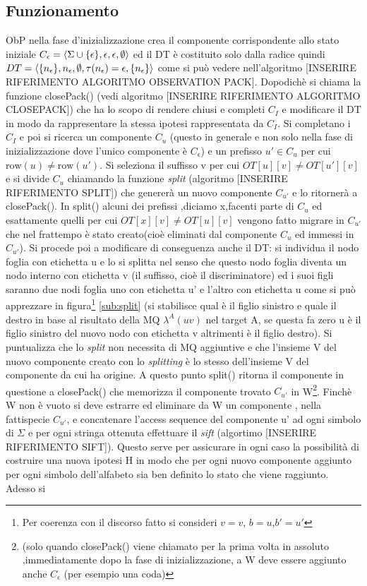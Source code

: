 \subsection{Funzionamento}
\ac{ObP} nella fase d'inizializzazione crea il componente corrispondente allo stato iniziale $C_{\epsilon} = \Braket{\Sigma \cup \{\epsilon\},\epsilon,\epsilon,\emptyset}$ ed il \ac{DT} è costituito solo dalla radice quindi $DT = \Braket{\{n_{\epsilon}\},n_{\epsilon},\emptyset,\tau(n_{\epsilon})=\epsilon,\{n_{\epsilon}\}}$ come si può vedere nell'algoritmo [INSERIRE RIFERIMENTO ALGORITMO OBSERVATION PACK]. Dopodichè si chiama la funzione closePack() (vedi algoritmo [INSERIRE RIFERIMENTO ALGORITMO CLOSEPACK]) che ha lo scopo di rendere chiusi e completi $C_{I}$ e modificare il \ac{DT} in modo da rappresentare la stessa ipotesi rappresentata da $C_{I}$. Si completano i $C_{I}$ e poi si ricerca un componente $C_{u}$ (questo in generale e non solo nella fase di inizializzazione dove l'unico componente è $C_{\epsilon}$) e un prefisso $u' \in C_{u}$ per cui $\text{row}(u) \neq \text{row}(u')$. Si seleziona il suffisso v per cui $OT[u][v] \neq OT[u'][v]$ e si divide $C_u$ chiamando la funzione \textit{split} (algoritmo [INSERIRE RIFERIMENTO SPLIT]) che genererà un nuovo componente $C_{u'}$ e lo ritornerà a closePack(). In split() alcuni dei prefissi ,diciamo x,facenti parte di $C_{u}$ ed esattamente quelli per cui $OT[x][v] \neq OT[u][v]$ vengono fatto migrare in $C_{u'}$ che nel frattempo è stato creato(cioè eliminati dal componente $C_{u}$ ed immessi in $C_{u'}$). Si procede poi a modificare di conseguenza anche il \ac{DT}: si individua il nodo foglia con etichetta u e lo si splitta nel senso che questo nodo foglia diventa un nodo interno con etichetta v (il suffisso, cioè il discriminatore) ed i suoi figli saranno due nodi foglia uno con etichetta u' e l'altro con etichetta u come si può apprezzare in figura\footnote{Per coerenza con il discorso fatto si consideri $v=v$, $b=u$,$b'=u'$} \ref{sub:split} (si stabilisce qual è il figlio sinistro e quale il destro in base al risultato della \ac{MQ} $\lambda^{A}(uv)$ nel target A, se questa fa zero u è il figlio sinistro del nuovo nodo con etichetta v altrimenti è il figlio destro). Si puntualizza che lo \textit{split} non necessita di \ac{MQ} aggiuntive e che l'insieme V del nuovo componente creato con lo \textit{splitting} è lo stesso dell'insieme V del componente da cui ha origine. A questo punto split() ritorna il componente in questione a closePack() che memorizza il componente trovato $C_{u'}$ in W\footnote{ (solo quando closePack() viene chiamato per la prima volta in assoluto ,immediatamente dopo la fase di inizializzazione, a W deve essere aggiunto anche $C_{\epsilon}$ (per esempio una coda)}. Finchè W non è vuoto si deve estrarre ed eliminare da W un componente , nella fattispecie $C_{u'}$, e concatenare l'access sequence del componente u' ad ogni simbolo di $\Sigma$ e per ogni stringa ottenuta effettuare il \textit{sift} (algortimo [INSERIRE RIFERIMENTO SIFT]). Questo serve per assicurare in ogni caso la possibilità di costruire una nuova ipotesi \ac{H} in modo che per ogni nuovo componente aggiunto per ogni simbolo dell'alfabeto sia ben definito lo stato che viene raggiunto. Adesso si 